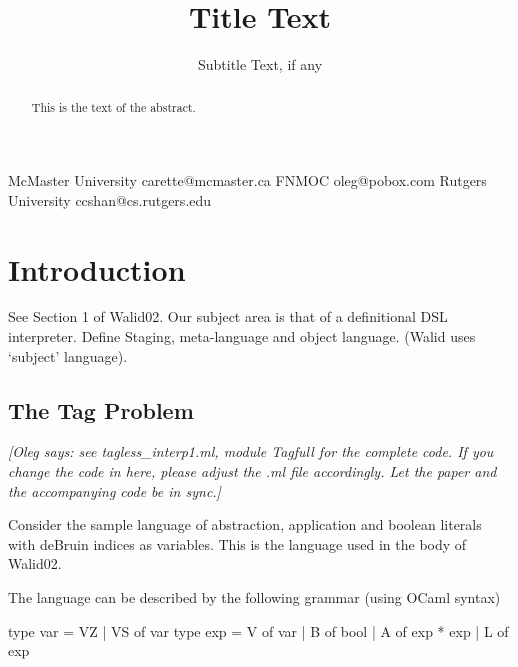 \documentclass[preprint]{sigplanconf}
\newcommand{\oleg}[1]{{\it [Oleg says: #1]}}
\begin{document}
\copyrightdata{[to be supplied]} 


\title{Title Text}
\subtitle{Subtitle Text, if any}

           {McMaster University}
           {carette@mcmaster.ca}
           {FNMOC}
           {oleg@pobox.com}
           {Rutgers University}
           {ccshan@cs.rutgers.edu}

\maketitle

\begin{abstract}
This is the text of the abstract.
\end{abstract}


\section{Introduction}

See Section 1 of Walid02. Our subject area is that of a definitional DSL
interpreter.
Define Staging, meta-language and object language. (Walid uses
`subject' language).


\subsection{The Tag Problem}

\oleg{see tagless\_interp1.ml, module Tagfull for the complete code.
If you change the code in here, please adjust the .ml file
accordingly. Let the paper and the accompanying code be in sync.}


Consider the sample language of abstraction, application and boolean
literals with deBruin indices as variables. This is the language used
in the body of Walid02.

The language can be described by the following grammar (using OCaml
syntax)


\begin{code}
  type var = VZ | VS of var
  type exp = V of var | B of bool | A of exp * exp | L of exp
\end{code}
\end{document}
